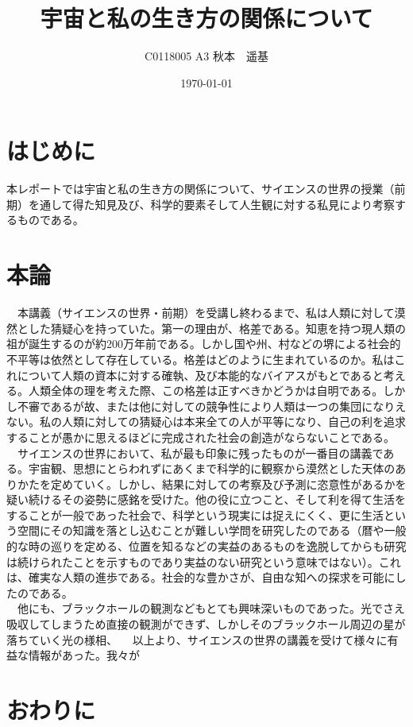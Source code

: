\documentclass[uplatex, titlepage]{jsarticle}
\title{宇宙と私の生き方の関係について}
\author{C0118005 A3 秋本　遥基}
\date{\today}
\begin{document}
\maketitle

\section{はじめに}

 本レポートでは宇宙と私の生き方の関係について、サイエンスの世界の授業（前期）を通して得た知見及び、科学的要素そして人生観に対する私見により考察するものである。

\section{本論}

　本講義（サイエンスの世界・前期）を受講し終わるまで、私は人類に対して漠然とした猜疑心を持っていた。第一の理由が、格差である。知恵を持つ現人類の祖が誕生するのが約200万年前である。しかし国や州、村などの堺による社会的不平等は依然として存在している。格差はどのように生まれているのか。私はこれについて人類の資本に対する確執、及び本能的なバイアスがもとであると考える。人類全体の理を考えた際、この格差は正すべきかどうかは自明である。しかし不審であるが故、または他に対しての競争性により人類は一つの集団になりえない。私の人類に対しての猜疑心は本来全ての人が平等になり、自己の利を追求することが愚かに思えるほどに完成された社会の創造がならないことである。\\
　サイエンスの世界において、私が最も印象に残ったものが一番目の講義である。宇宙観、思想にとらわれずにあくまで科学的に観察から漠然とした天体のありかたを定めていく。しかし、結果に対しての考察及び予測に恣意性があるかを疑い続けるその姿勢に感銘を受けた。他の役に立つこと、そして利を得て生活をすることが一般であった社会で、科学という現実には捉えにくく、更に生活という空間にその知識を落とし込むことが難しい学問を研究したのである（暦や一般的な時の巡りを定める、位置を知るなどの実益のあるものを逸脱してからも研究は続けられたことを示すものであり実益のない研究という意味ではない）。これは、確実な人類の進歩である。社会的な豊かさが、自由な知への探求を可能にしたのである。\\
　他にも、ブラックホールの観測などもとても興味深いものであった。光でさえ吸収してしまうため直接の観測ができず、しかしそのブラックホール周辺の星が落ちていく光の様相、
　以上より、サイエンスの世界の講義を受けて様々に有益な情報があった。我々が

\section{おわりに}
\end{document}
